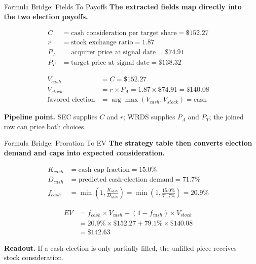 \documentclass[aspectratio=169,11pt]{beamer}
\newcommand{\usd}[1]{\$#1}
\begin{document}
\begin{frame}{Formula Bridge: Fields To Payoffs}
\small
\textbf{The extracted fields map directly into the two election payoffs.}

\vspace{0.4em}
\begin{align*}
C &= \text{cash consideration per target share} = \usd{152.27} \\
r &= \text{stock exchange ratio} = 1.87 \\
P_A &= \text{acquirer price at signal date} = \usd{74.91} \\
P_T &= \text{target price at signal date} = \usd{138.32}
\end{align*}

\vspace{0.2em}
\begin{align*}
V_{cash} &= C = \usd{152.27} \\
V_{stock} &= r \times P_A = 1.87 \times \usd{74.91} = \usd{140.08} \\
\text{favored election} &= \arg\max(V_{cash}, V_{stock}) = \text{cash}
\end{align*}

\vspace{0.3em}
\textbf{Pipeline point.} SEC supplies $C$ and $r$; WRDS supplies $P_A$ and $P_T$; the joined row can price both choices.
\end{frame}

\begin{frame}{Formula Bridge: Proration To EV}
\small
\textbf{The strategy table then converts election demand and caps into expected consideration.}

\vspace{0.3em}
\begin{align*}
K_{cash} &= \text{cash cap fraction} = 15.0\% \\
D_{cash} &= \text{predicted cash-election demand} = 71.7\% \\
f_{cash} &= \min\left(1,\frac{K_{cash}}{D_{cash}}\right)
          = \min\left(1,\frac{15.0\%}{71.7\%}\right)
          = 20.9\%
\end{align*}

\vspace{0.2em}
\begin{align*}
EV
&= f_{cash} \times V_{cash} + (1-f_{cash}) \times V_{stock} \\
&= 20.9\% \times \usd{152.27}
   + 79.1\% \times \usd{140.08} \\
&= \usd{142.63}
\end{align*}

\vspace{0.2em}
\textbf{Readout.} If a cash election is only partially filled, the unfilled piece receives stock consideration.
\end{frame}
\end{document}
